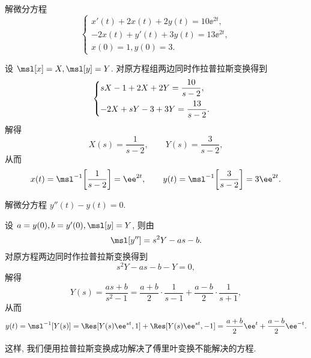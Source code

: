 \begin{example}
  解微分方程
  \[
    \begin{cases}
      x'(t)+2x(t)+2y(t)=10\ee^{2t}, \\
      -2x(t)+y'(t)+3y(t)=13\ee^{2t}, \\
      x(0)=1,y(0)=3.
    \end{cases}
  \]
\end{example}

\begin{solution}
  设 $\msl[x]=X,\msl[y]=Y$.
  对原方程组两边同时作拉普拉斯变换得到
  \[
    \begin{cases}
      sX-1+2X+2Y=\dfrac{10}{s-2},\\[2\itemsep]
      -2X+sY-3+3Y=\dfrac{13}{s-2}.
    \end{cases}
  \]
  解得
  \[
    X(s)=\frac1{s-2},\qquad 
    Y(s)=\frac3{s-2},
  \]
  从而
  \[
     x(t)
    =\msl^{-1}\biggl[\frac1{s-2}\biggr]
    =\ee^{2t},\qquad
     y(t)
    =\msl^{-1}\biggl[\frac3{s-2}\biggr]
    =3\ee^{2t}.
  \]
\end{solution}

\begin{example}
  解微分方程 $y''(t)-y(t)=0$.
\end{example}

\begin{solution}
  设 $a=y(0),b=y'(0),\msl[y]=Y$, 则由\thmLDif
  \[
    \msl[y'']=s^2Y-as-b.
  \]
  对原方程两边同时作拉普拉斯变换得到
  \[
    s^2Y-as-b-Y=0,
  \]
  解得
  \[
     Y(s)
    =\frac{as+b}{s^2-1}
    =\frac{a+b}2\cdot\frac1{s-1}+\frac{a-b}2\cdot\frac1{s+1},
  \]
  从而
  \[
     y(t)
    =\msl^{-1}[Y(s)]
    =\Res[Y(s)\ee^{st},1]+\Res[Y(s)\ee^{st},-1]
    =\frac{a+b}2\ee^t+\frac{a-b}2\ee^{-t}.
  \]
\end{solution}

这样, 我们便用拉普拉斯变换成功解决了傅里叶变换不能解决的方程.


\newpage
\startwidepage
{}

